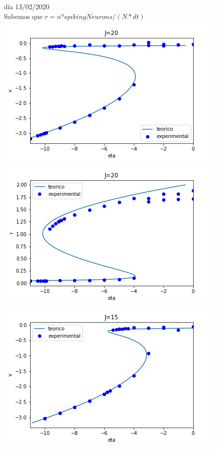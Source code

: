 \documentclass[a4paper]{article}
\begin{document}
día 13/02/2020\\
Sabemos que $r = nºspiking Neurons/(N*dt)$\\
\includegraphics[scale=0.7]{v_vs_eta_J20.png}\\
\includegraphics[scale=0.7]{r_vs_eta_J20.png}\\
\includegraphics[scale=0.7]{v_vs_eta_J15.png}\\
\end{document}
